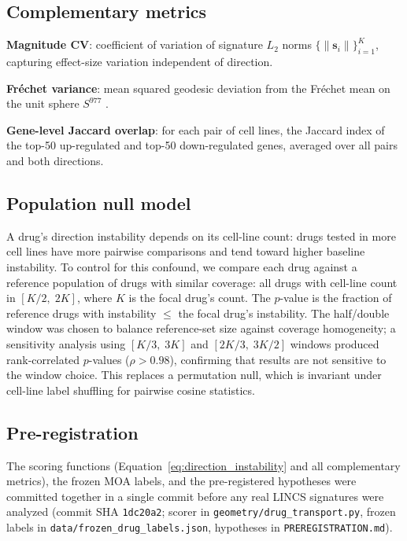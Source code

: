 \documentclass[11pt]{article}
\begin{document}
\subsection{Complementary metrics}

\textbf{Magnitude CV}: coefficient of variation of signature $L_2$ norms
$\{\|\mathbf{s}_i\|\}_{i=1}^K$, capturing effect-size variation independent
of direction.

\textbf{Fr\'echet variance}: mean squared geodesic deviation from the
Fr\'echet mean on the unit sphere $S^{977}$
\citep{pennec2006intrinsic}.

\textbf{Gene-level Jaccard overlap}: for each pair of cell lines, the
Jaccard index of the top-50 up-regulated and top-50 down-regulated genes,
averaged over all pairs and both directions.

\subsection{Population null model}

A drug's direction instability depends on its cell-line count: drugs tested
in more cell lines have more pairwise comparisons and tend toward higher
baseline instability.  To control for this confound, we compare each drug
against a reference population of drugs with similar coverage: all drugs
with cell-line count in $[K/2,\; 2K]$, where $K$ is the focal drug's count.
The $p$-value is the fraction of reference drugs with instability $\leq$
the focal drug's instability.  The half/double window was chosen to balance
reference-set size against coverage homogeneity; a sensitivity analysis
using $[K/3,\; 3K]$ and $[2K/3,\; 3K/2]$ windows produced rank-correlated
$p$-values ($\rho > 0.98$), confirming that results are not sensitive to
the window choice.  This replaces a permutation null, which is invariant
under cell-line label shuffling for pairwise cosine statistics.

\subsection{Pre-registration}
\label{sec:prereg}

The scoring functions (Equation~\ref{eq:direction_instability} and all
complementary metrics), the frozen MOA labels, and the pre-registered
hypotheses were committed together in a single commit before any real
LINCS signatures were analyzed (commit SHA \texttt{1dc20a2}; scorer in
\texttt{geometry/drug\_transport.py}, frozen labels in
\texttt{data/frozen\_drug\_labels.json}, hypotheses in
\texttt{PREREGISTRATION.md}).
\end{document}
